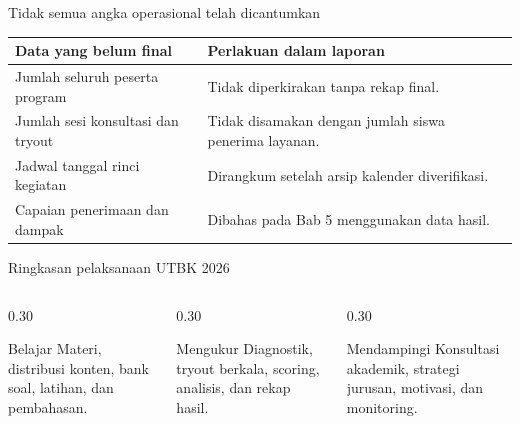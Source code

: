 \begin{frame}[shrink=6]{Tidak semua angka operasional telah dicantumkan}
  {\fontsize{10.4}{13}\selectfont
  \renewcommand{\arraystretch}{1.03}
  \begin{tabularx}{\textwidth}{>{\RaggedRight\arraybackslash}p{} >{\RaggedRight\arraybackslash}X}
    \toprule
    \textbf{Data yang belum final} & \textbf{Perlakuan dalam laporan} \\
    \midrule
    Jumlah seluruh peserta program & Tidak diperkirakan tanpa rekap final. \\
    Jumlah sesi konsultasi dan tryout & Tidak disamakan dengan jumlah siswa penerima layanan. \\
    Jadwal tanggal rinci kegiatan & Dirangkum setelah arsip kalender diverifikasi. \\
    Capaian penerimaan dan dampak & Dibahas pada Bab 5 menggunakan data hasil. \\
    \bottomrule
  \end{tabularx}}
  \vspace{0.18cm}
\end{frame}

\begin{frame}{Ringkasan pelaksanaan UTBK 2026}
  \begin{columns}[T,onlytextwidth]
    \begin{column}{0.30\textwidth}
      \begin{block}{Belajar}
        Materi, distribusi konten, bank soal, latihan, dan pembahasan.
      \end{block}
    \end{column}
    \begin{column}{0.30\textwidth}
      \begin{block}{Mengukur}
        Diagnostik, tryout berkala, scoring, analisis, dan rekap hasil.
      \end{block}
    \end{column}
    \begin{column}{0.30\textwidth}
      \begin{block}{Mendampingi}
        Konsultasi akademik, strategi jurusan, motivasi, dan monitoring.
      \end{block}
    \end{column}
  \end{columns}
  \vspace{0.30cm}
\end{frame}
